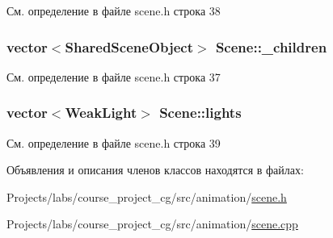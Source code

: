 См. определение в файле scene.\+h строка 38

\subsubsection[{\texorpdfstring{\+\_\+children}{_children}}]{\setlength{\rightskip}{0pt plus 5cm}vector$<${\bf Shared\+Scene\+Object}$>$ Scene\+::\+\_\+children\hspace{0.3cm}{\ttfamily [protected]}}\hypertarget{class_scene_a14327127e1a055c38eacc5b524d293c5}{}\label{class_scene_a14327127e1a055c38eacc5b524d293c5}


См. определение в файле scene.\+h строка 37

\subsubsection[{\texorpdfstring{lights}{lights}}]{\setlength{\rightskip}{0pt plus 5cm}vector$<${\bf Weak\+Light}$>$ Scene\+::lights\hspace{0.3cm}{\ttfamily [protected]}}\hypertarget{class_scene_aa82b5e8b6ba1d05fae6a836962cded02}{}\label{class_scene_aa82b5e8b6ba1d05fae6a836962cded02}


См. определение в файле scene.\+h строка 39



Объявления и описания членов классов находятся в файлах\+:\begin{DoxyCompactItemize}
\item 
Projects/labs/course\+\_\+project\+\_\+cg/src/animation/\hyperlink{scene_8h}{scene.\+h}\item 
Projects/labs/course\+\_\+project\+\_\+cg/src/animation/\hyperlink{scene_8cpp}{scene.\+cpp}\end{DoxyCompactItemize}
